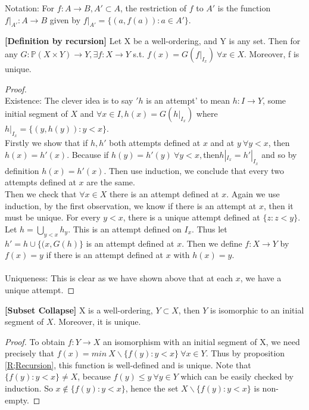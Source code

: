 Notation: For $f: A \rightarrow B, A' \subset A$, the restriction
of $f$ to $A'$ is the function $f|_{A'}: A \rightarrow B$
given by  $f|_{A'}=\{(a,f(a)):a \in A'\}$.
\begin{theorem}{\bf [Definition by recursion]}\label{R;Recursion}
Let X be a well-ordering, and Y is any set. Then for any
$G: \mathbb{P}(X \times Y) \rightarrow Y, \exists f: X \rightarrow Y$
s.t. $f(x)=G(f|_{I_x})~\forall x \in X$. Moreover, f is unique.
\end{theorem}
\begin{proof}
~\\
Existence: The clever idea is to say $'h$ is an attempt' to mean
$h: I \rightarrow Y$, some initial segment of $X$ and $\forall x \in I,
h(x)=G(h|_{I_x})$ where $h|_{I_x}=\{(y,h(y)): y<x\}$.\\
Firstly we show that if $h,h'$ both attempts defined at $x$ and at
 $y~\forall y<x$, then $h(x)=h'(x)$. Because if $h(y)=h'(y)~\forall y<x,
 $then$ h|_{I_x}=h'|_{I_x}$ and so by definition $h(x)=h'(x)$.
 Then use induction, we conclude that every two attempts defined at
 $x$ are the same.\\
Then we check that $\forall x \in X$ there is an attempt defined at $x$.
Again we use induction, by the first observation, we know if there is
an attempt at $x$, then it must be unique. For every $y<x$,
there is a unique attempt defined at $\{z:z<y\}$. Let $h=\bigcup_{y<x} h_y$.
This is an attempt defined on $I_x$. Thus let $h'=h \cup \{(x,G(h)\}$
is an attempt defined at $x$. Then we define $f: X \rightarrow Y$ by $f(x)=y$
if there is an attempt defined at $x$ with $h(x)=y$.\\
~\\
Uniqueness: This is clear as we have shown above that at each $x$,
we have a unique attempt.
\end{proof}
\begin{proposition}{\bf [Subset Collapse]}\label{C;Collapse}
X is a well-ordering, $Y \subset X$, then $Y$ is isomorphic to an
initial segment of $X$. Moreover, it is unique.
\end{proposition}
\begin{proof} To obtain $f: Y \rightarrow X$ an isomorphism with an
initial segment of X, we need precisely that $f(x)=min~ X \backslash
\{f(y): y<x\}~\forall x \in Y$. Thus by proposition \ref{R;Recursion},
 this function is well-defined and is unique. Note that $\{f(y):y<x\}
 \neq X$, because $f(y) \le y ~\forall y \in Y$ which can be easily
 checked by induction. So $x \not \in \{f(y): y<x\}$, hence the set
 $X \backslash \{f(y): y<x\}$ is non-empty.
\end{proof}
